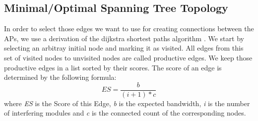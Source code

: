   \subsection{Minimal/Optimal Spanning Tree Topology}
  In order to select those edges we want to use for creating connections between the APs, we use a derivation of the dijkstra shortest paths algorithm \cite{dijkstra1959note}.
  We start by selecting an arbitray initial node and marking it as visited. All edges from this set of visited nodes to unvisited nodes are called productive edges.
  We keep those productive edges in a list sorted by their scores. The score of an edge is determined by the following formula:
  \begin{equation} \label{eq:edgescore}
    ES=\frac{b}{(i + 1 )* c}
  \end{equation}
  where \textit{ES} is the Score of this Edge, \textit{b} is the expected bandwidth, \textit{i} is the number of 
  interfering modules and \textit{c} is the connected count of the corresponding nodes.
